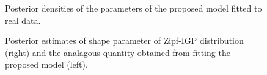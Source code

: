 \documentclass[
  sn-basic,
  10pt,
]{sn-jnl}
\theoremstyle{plain}
\theoremstyle{plain}
\theoremstyle{remark}
\begin{document}
\begin{figure}


\caption{\label{fig-parplot}Posterior densities of the parameters of the
proposed model fitted to real data.}

\end{figure}%

\begin{figure}[H]


\caption{\label{fig-shapes}Posterior estimates of shape parameter of
Zipf-IGP distribution (right) and the analagous quantity obtained from
fitting the proposed model (left).}

\end{figure}%
\end{document}
